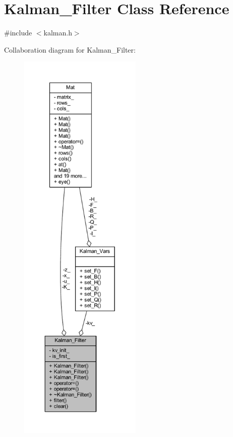 \hypertarget{class_kalman___filter}{}\section{Kalman\+\_\+\+Filter Class Reference}
\label{class_kalman___filter}


{\ttfamily \#include $<$kalman.\+h$>$}



Collaboration diagram for Kalman\+\_\+\+Filter\+:
\nopagebreak
\begin{figure}[H]
\begin{center}
\leavevmode
\includegraphics[height=550pt]{class_kalman___filter__coll__graph}
\end{center}
\end{figure}
